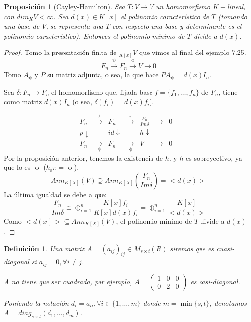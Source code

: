 \documentclass[11pt,a4paper]{article}
\theoremstyle{break}
\newtheorem{definition}[theorem]{Definición}
\newtheorem{proposition}[theorem]{Proposición}
\begin{document}
\begin{proposition}[Cayley-Hamilton]
Sea $T: V \to V$ un homomorfismo $K-$lineal, con $dim_{K}V < \infty$. Sea $d(x) \in K[x]$ el polinomio característico de $T$ (tomando una base de $V$, se representa una $T$ con respecto una base y determinante es el polinomio característico). Entonces el polinomio mínimo de $T$ divide a $d(x)$.
\end{proposition}

\begin{proof}
Tomo la presentación finita de $_{K[x]}V$ que vimos al final del ejemplo 7.25.
$$F_{n} \overset{\uppsi}{\to} F_{n} \overset{\upphi}{\to} V \to 0$$
Tomo $A_{\uppsi}$ y $P$ su matriz adjunta, o sea, la que hace $PA_{\uppsi} = d(x)I_{n}$.

Sea $\delta: F_{n} \to F_{n}$ el homomorfismo que, fijada base $f = \{f_{1}, \dots, f_{n}\}$ de $F_{n}$, tiene como matriz $d(x)I_{n}$ (o sea, $\delta(f_{i}) = d(x)f_{i}$).

$$\begin{aligned}
F_{n} & \overset{\delta}{\to} & F_{n} & \overset{\pi}{\to} & \frac{F_{n}}{Im \delta} & \to & 0 \\
p \downarrow & & id \downarrow & & h \downarrow & & & \\
F_{n} & \underset{\uppsi}{\to} & F_{n} & \underset{\upphi}{\to} & V & \to & 0
\end{aligned}$$
Por la proposición anterior, tenemos la existencia de $h$, y $h$ es sobreyectivo, ya que lo es $\upphi$ ($h_{o}\pi = \upphi$).
$$Ann_{K[X]} (V) \supseteq Ann_{K[X]}(\frac{F_{n}}{Im \delta}) = <d(x)>$$
La última igualdad se debe a que:
$$\frac{F_{n}}{Im \delta} \cong \oplus_{i=1}^{n} \frac{K[x] f_{i}}{K[x] d(x) f_{i}} = \oplus_{i=1}^{n} \frac{K[x]}{<d(x)>}$$
Como $<d(x)> \subseteq Ann_{K[X]}(V)$, el polinomio mínimo de $T$ divide a $d(x)$.
\end{proof}


\begin{definition}
Una matriz $A = (a_{ij})_{ij} \in M_{s \times t} (R)$ siremos que es cuasi-diagonal si $a_{ij} = 0, \forall i \neq j$.

A no tiene que ser cuadrada, por ejemplo, $A = \begin{pmatrix}
1 & 0 & 0 \\
0 & 2 & 0
\end{pmatrix}$ es casi-diagonal.

Poniendo la notación $d_{i} = a_{ii}, \forall i \in \{1, \dots, m\}$ donde $m = \min\{s, t\}$, denotamos $A = diag_{s \times t}(d_{1}, \dots, d_{m})$.
\end{definition}
\end{document}
